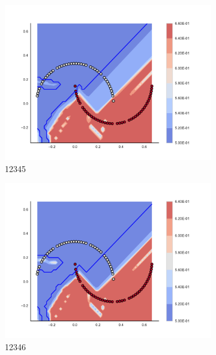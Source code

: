 \begin{figure}[h]
\begin{subfigure}[b]{0.09\textwidth}
    \includegraphics[clip, trim=2.35cm 1.75cm 4.5cm 0cm,width=\textwidth]{img/convergence/12345.pdf}
    \caption{12345}
    \label{fig:convergence_12345}
\end{subfigure}
%
\begin{subfigure}[b]{0.09\textwidth}
    \includegraphics[clip, trim=2.35cm 1.75cm 4.5cm 0cm,width=\textwidth]{img/convergence/12346.pdf}
    \caption{12346}
    \label{fig:convergence_12346}
\end{subfigure}
%
\begin{subfigure}[b]{0.09\textwidth}

\end{subfigure}
\end{figure}
